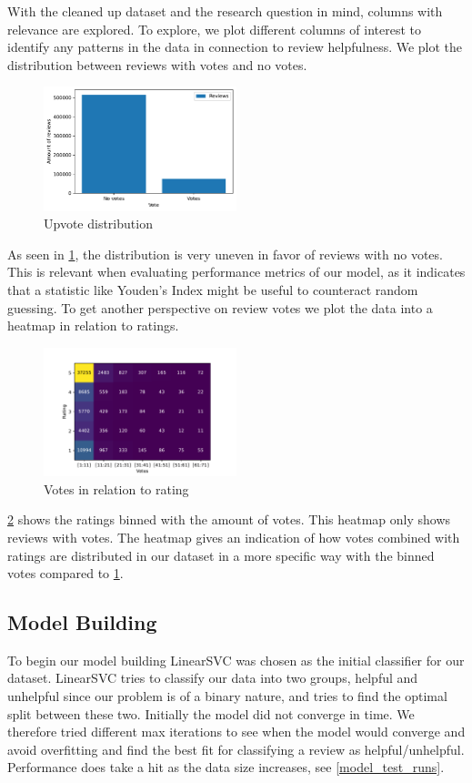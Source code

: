 \documentclass[twoside,twocolumn]{article}
\begin{document}
With the cleaned up dataset and the research question in mind, columns with relevance are explored. To explore, we plot different columns of interest to identify any patterns in the data in connection to review helpfulness. We plot the distribution between reviews with votes and no votes.
\begin{figure}[h]
	\centering
	\includegraphics[width=0.5\textwidth]{img/no_votes_vs_votes.pdf}
	\caption{Upvote distribution}
	\label{fig:votes_distribution}
\end{figure}
As seen in \figurename{\ref{fig:votes_distribution}}, the distribution is very uneven in favor of reviews with no votes. This is relevant when evaluating performance metrics of our model, as it indicates that a statistic like Youden's Index might be useful to counteract random guessing. To get another perspective on review votes we plot the data into a heatmap in relation to ratings.
\begin{figure}[h]
	\centering
	\includegraphics[width=0.5\textwidth]{img/rating_vote_heatmap_excluding_no_votes.pdf}
	\caption{Votes in relation to rating}
	\label{fig:rating_vote_heatmap}
\end{figure}
\figurename{\ref{fig:rating_vote_heatmap}} shows the ratings binned with the amount of votes. This heatmap only shows reviews with votes. The heatmap gives an indication of how votes combined with ratings are distributed in our dataset in a more specific way with the binned votes compared to \figurename{\ref{fig:votes_distribution}}.

\subsection{Model Building}
To begin our model building LinearSVC was chosen as the initial classifier for our dataset. LinearSVC tries to classify our data into two groups, helpful and unhelpful since our problem is of a binary nature, and tries to find the optimal split between these two\cite{sklearn:LinearSVC}. Initially the model did not converge in time. We therefore tried different max iterations to see when the model would converge and avoid overfitting and find the best fit for classifying a review as helpful/unhelpful. Performance does take a hit as the data size increases, see \figurename{\ref{model_test_runs}}.
\end{document}
